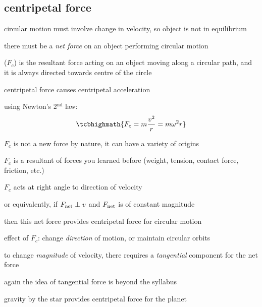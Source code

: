 \subsection{centripetal force}

circular motion must involve change in velocity, so object is not in equilibrium 

there must be a \emph{net force} on an object performing circular motion 

\begin{ilight}
	 ($F_c$) is the resultant force acting on an object
	moving along a circular path, and it is always directed towards centre of the circle
\end{ilight}

\cmt centripetal force causes centripetal acceleration

using Newton's 2$^\text{nd}$ law: $$\tcbhighmath{ F_c = m\frac{v^2}{r} = m\omega^2r}$$

\cmt $F_c$ is not a new force by nature, it can have a variety of origins

$F_c$ is a resultant of forces you learned before (weight, tension, contact force, friction, etc.)

\cmt $F_c$ acts at right angle to direction of velocity

or equivalently, if $F_\text{net} \perp v$ and $F_\text{net}$ is of constant magnitude

then this net force provides centripetal force for circular motion

\cmt effect of $F_c$: change \emph{direction} of motion, or maintain circular orbits

to change \emph{magnitude} of velocity, there requires a \emph{tangential} component for the net force

again the idea of tangential force is beyond the syllabus

\begin{soln}
\begin{center}
\end{center}
gravity by the star provides centripetal force for the planet
\end{soln}



